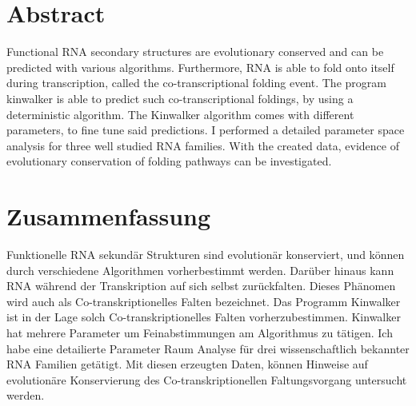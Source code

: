 \begingroup
\let\clearpage\relax
\let\cleardoublepage\relax
\let\cleardoublepage\relax

\chapter*{Abstract}
Functional RNA secondary structures are evolutionary conserved and can be predicted with various algorithms. Furthermore, RNA is able to fold onto itself during transcription, called the co-transcriptional folding event. The program kinwalker is able to predict such co-transcriptional foldings, by using a deterministic algorithm. The Kinwalker algorithm comes with different parameters, to fine tune said predictions. I performed a detailed parameter space analysis for three well studied RNA families. With the created data, evidence of evolutionary conservation of folding pathways can be investigated.




\vfill
\chapter*{Zusammenfassung}



Funktionelle RNA sekund{\"a}r Strukturen sind evolution{\"a}r konserviert, und k{\"o}nnen durch verschiedene Algorithmen vorherbestimmt werden. Dar{\"u}ber hinaus kann RNA w{\"a}hrend der Transkription auf sich selbst zur{\"u}ckfalten. Dieses Ph{\"a}nomen wird auch als Co-transkriptionelles Falten bezeichnet. Das Programm Kinwalker ist in der Lage solch Co-transkriptionelles Falten vorherzubestimmen. Kinwalker hat mehrere Parameter um Feinabstimmungen am Algorithmus zu t{\"a}tigen. Ich habe eine detailierte Parameter Raum Analyse f{\"u}r drei wissenschaftlich bekannter RNA Familien get{\"a}tigt. Mit diesen erzeugten Daten, k{\"o}nnen Hinweise auf evolution{\"a}re Konservierung des Co-transkriptionellen Faltungsvorgang untersucht werden.




\endgroup			

\vfill